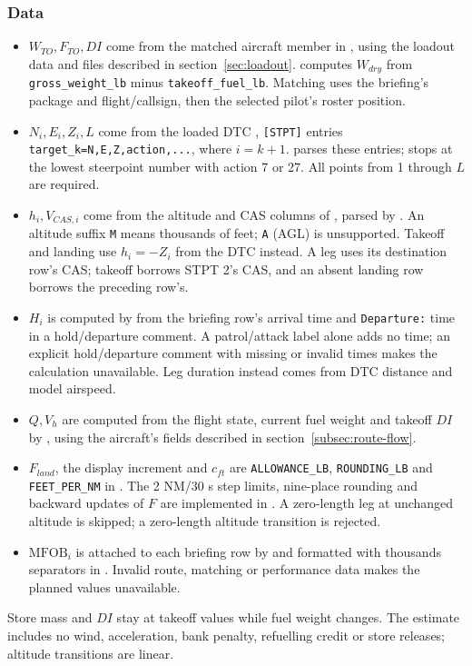 \documentclass[10pt,a4paper]{amsart}
\begin{document}
\subsubsection*{Data}
\begin{itemize}
\setlength{\itemsep}{0pt}
\setlength{\parsep}{0pt}
\item $W_{TO},F_{TO},DI$ come from the matched aircraft member in
, using the loadout data and files described in
section~\ref{sec:loadout}. 
computes $W_{dry}$ from \texttt{gross\_weight\_lb} minus
\texttt{takeoff\_fuel\_lb}. Matching uses the briefing's package and
flight/callsign, then the selected pilot's roster position.
\item $N_i,E_i,Z_i,L$ come from the loaded DTC
, \texttt{[STPT]} entries
\texttt{target\_k=N,E,Z,action,...}, where $i=k+1$.
 parses these entries;
 stops at the lowest steerpoint
number with action 7 or 27. All points from 1 through $L$ are required.
\item $h_i,V_{CAS,i}$ come from the altitude and CAS columns of
, parsed by
. An altitude suffix
\texttt{M} means thousands of feet; \texttt{A} (AGL) is unsupported.
Takeoff and landing use $h_i=-Z_i$ from the DTC instead.
A leg uses its destination row's CAS; takeoff borrows STPT 2's CAS,
and an absent landing row borrows the preceding row's.
\item $H_i$ is computed by 
from the briefing row's arrival time and \texttt{Departure:} time in
a hold/departure comment. A patrol/attack label alone adds no time;
an explicit hold/departure comment with missing or invalid times
makes the calculation unavailable. Leg duration instead comes from
DTC distance and model airspeed.
\item $Q,V_h$ are computed from the flight state, current fuel weight
and takeoff $DI$ by ,
using the aircraft's  fields described in
section~\ref{subsec:route-flow}.
\item $F_{land}$, the display increment and $c_{ft}$ are
\texttt{ALLOWANCE\_LB}, \texttt{ROUNDING\_LB} and \texttt{FEET\_PER\_NM}
in . The 2 NM/30 s step limits, nine-place rounding
and backward updates of $F$ are implemented in
.
A zero-length leg at unchanged altitude is skipped; a zero-length
altitude transition is rejected.
\item $\mathrm{MFOB}_i$ is attached to each briefing row by
 and formatted with thousands
separators in . Invalid route,
matching or performance data makes the planned values unavailable.
\end{itemize}
Store mass and $DI$ stay at takeoff values while fuel weight changes.
The estimate includes no wind, acceleration, bank penalty, refuelling
credit or store releases; altitude transitions are linear.
\end{document}
